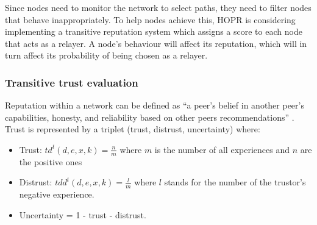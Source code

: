 Since nodes need to monitor the network to select paths, they need to filter
nodes that behave inappropriately. To help nodes achieve this, HOPR is considering implementing a
transitive reputation system which assigns a score to each node that acts as a
relayer. A node’s behaviour will affect its reputation, which will in turn affect its probability of
being chosen as a relayer.

\subsubsection*{Transitive trust evaluation }

Reputation within a network can be defined as ``a peer’s belief in another peer’s
capabilities, honesty, and reliability based on other peers recommendations” \cite{Wang_2003}.
Trust is represented by a triplet (trust, distrust, uncertainty) where:

\begin{itemize}

    \item Trust: $td^t(d,e,x,k)=\frac{n}{m}$ where $m$ is the number of all
        experiences and $n$ are the positive ones

    \item Distrust: $tdd^t(d,e,x,k)=\frac{l}{m}$ where $l$ stands for the number
        of the trustor’s negative experience.

    \item Uncertainty = 1 - trust - distrust.

\end{itemize}
